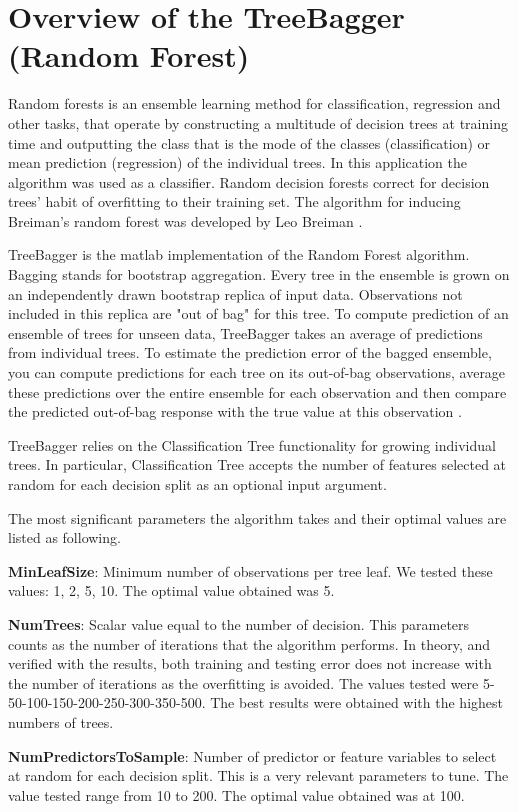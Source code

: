 \chapter{Overview of the TreeBagger (Random Forest)}
\label{ch:ch2label}
Random forests is an ensemble learning method for classification, regression and other tasks, that operate by constructing a multitude of decision trees at training time and outputting the class that is the mode of the classes (classification) or mean prediction (regression) of the individual trees. In this application the algorithm was used as a classifier. Random decision forests correct for decision trees' habit of overfitting to their training set. The algorithm for inducing Breiman's random forest was developed by Leo Breiman \citep{breiman2001random}.
 
TreeBagger is the matlab implementation of the Random Forest algorithm. 
Bagging stands for bootstrap aggregation. Every tree in the ensemble is grown on an independently drawn bootstrap replica of input data. Observations not included in this replica are "out of bag" for this tree. To compute prediction of an ensemble of trees for unseen data, TreeBagger takes an average of predictions from individual trees. To estimate the prediction error of the bagged ensemble, you can compute predictions for each tree on its out-of-bag observations, average these predictions over the entire ensemble for each observation and then compare the predicted out-of-bag response with the true value at this observation \citep{treebagger}.

TreeBagger relies on the Classification Tree functionality for growing individual trees. In particular, Classification Tree accepts the number of features selected at random for each decision split as an optional input argument.

The most significant parameters the algorithm takes and their optimal values are listed as following. 

\textbf{MinLeafSize}: Minimum number of observations per tree leaf. We tested these values: 1, 2, 5, 10. The optimal value obtained was 5.

\textbf{NumTrees}: Scalar value equal to the number of decision. This parameters counts as the number of iterations that the algorithm performs. In theory, and verified with the results, both training and testing error does not increase with the number of iterations as the overfitting is avoided. The values tested were 5-50-100-150-200-250-300-350-500. The best results were obtained with the highest numbers of trees.

\textbf{NumPredictorsToSample}: Number of predictor or feature variables to select at random for each decision split. This is a very relevant parameters to tune. The value tested range from 10 to 200. The optimal value obtained was at 100.